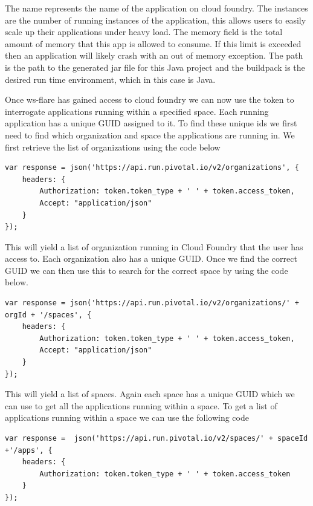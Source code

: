 The name represents the name of the application on cloud foundry. The instances are the number of running instances of the application, this allows users to easily scale up their applications under heavy load. The memory field is the total amount of memory that this app is allowed to consume. If this limit is exceeded then an application will likely crash with an out of memory exception. The path is the path to the generated jar file for this Java project and the buildpack is the desired run time environment, which in this case is Java.

Once ws-flare has gained access to cloud foundry we can now use the token to interrogate applications running within a specified space. Each running application has a unique GUID assigned to it. To find these unique ids we first need to find which organization and space the applications are running in. We first retrieve the list of organizations using the code below

\begin{verbatim}
var response = json('https://api.run.pivotal.io/v2/organizations', {
    headers: {
        Authorization: token.token_type + ' ' + token.access_token,
        Accept: "application/json"
    }
});
\end{verbatim}

This will yield a list of organization running in Cloud Foundry that the user has access to. Each organization also has a unique GUID. Once we find the correct GUID we can then use this to search for the correct space by using the code below.

\begin{verbatim}
var response = json('https://api.run.pivotal.io/v2/organizations/' + orgId + '/spaces', {
    headers: {
        Authorization: token.token_type + ' ' + token.access_token,
        Accept: "application/json"
    }
});
\end{verbatim}

This will yield a list of spaces. Again each space has a unique GUID which we can use to get all the applications running within a space. To get a list of applications running within a space we can use the following code

\begin{verbatim}
var response =  json('https://api.run.pivotal.io/v2/spaces/' + spaceId +'/apps', {
    headers: {
        Authorization: token.token_type + ' ' + token.access_token
    }
});
\end{verbatim}

